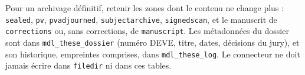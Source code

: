 \documentclass[11pt,a4paper]{article}
\begin{document}
\begin{astuce}
Pour un archivage définitif, retenir les zones dont le contenu ne change plus :
\texttt{sealed}, \texttt{pv}, \texttt{pvadjourned}, \texttt{subjectarchive},
\texttt{signedscan}, et le manuscrit de \texttt{corrections} ou, sans
corrections, de \texttt{manuscript}. Les métadonnées du dossier sont dans
\texttt{mdl\_these\_dossier} (numéro DEVE, titre, dates, décisions du jury), et
son historique, empreintes comprises, dans \texttt{mdl\_these\_log}. Le
connecteur ne doit jamais écrire dans \texttt{filedir} ni dans ces tables.
\end{astuce}
\end{document}
